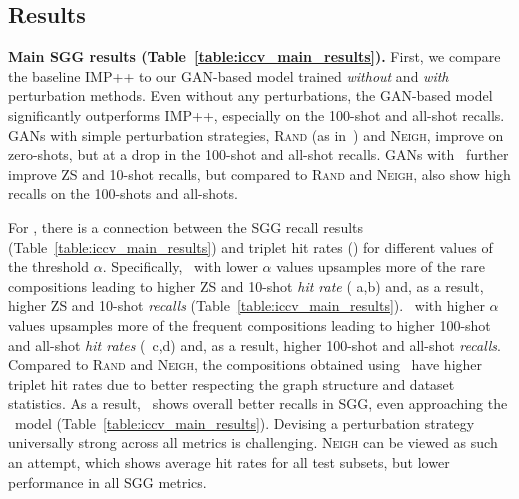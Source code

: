 \vspace{-3pt}
\subsection{Results\label{sec:iccv_results}}
\vspace{-3pt}

\textbf{Main SGG results (Table~\ref{table:iccv_main_results}).}
First, we compare the baseline IMP++ to our GAN-based model trained \textit{without} and \textit{with} perturbation methods.
Even without any perturbations, the GAN-based model significantly outperforms IMP++, especially on the 100-shot and all-shot recalls.
GANs with simple perturbation strategies, \textsc{Rand} (as in~\citep{wang2019generating}) and \textsc{Neigh}, improve on zero-shots, but at a drop in the 100-shot and all-shot recalls. 
GANs with \structn~further improve ZS and 10-shot recalls, but compared to \textsc{Rand} and \textsc{Neigh}, also show high recalls on the 100-shots and all-shots.%

For \structn, there is a connection between the SGG recall results (Table~\ref{table:iccv_main_results}) and triplet hit rates (\fig{\ref{fig:hit_rates}}) for different values of the threshold $\alpha$.
Specifically, 
\structn~with lower $\alpha$ values upsamples more of the rare compositions leading to higher ZS and 10-shot \textit{hit rate} (\fig{\ref{fig:hit_rates}} a,b) and, as a result, higher ZS and 10-shot \textit{recalls} (Table~\ref{table:iccv_main_results}).
\structn~with higher $\alpha$ values upsamples more of the frequent compositions leading to higher 100-shot and all-shot \textit{hit rates} (\fig{\ref{fig:hit_rates}}~c,d) and, as a result, higher 100-shot and all-shot \textit{recalls}.
Compared to \textsc{Rand} and \textsc{Neigh}, the compositions obtained using \structn~have higher triplet hit rates due to better respecting the graph structure and dataset statistics. As a result, \structn~shows overall better recalls in SGG, even approaching the \oracle~model (Table~\ref{table:iccv_main_results}). 
Devising a perturbation strategy universally strong across all metrics is challenging. \textsc{Neigh} can be viewed as such an attempt, which shows average hit rates for all test subsets, but lower performance in all SGG metrics.

